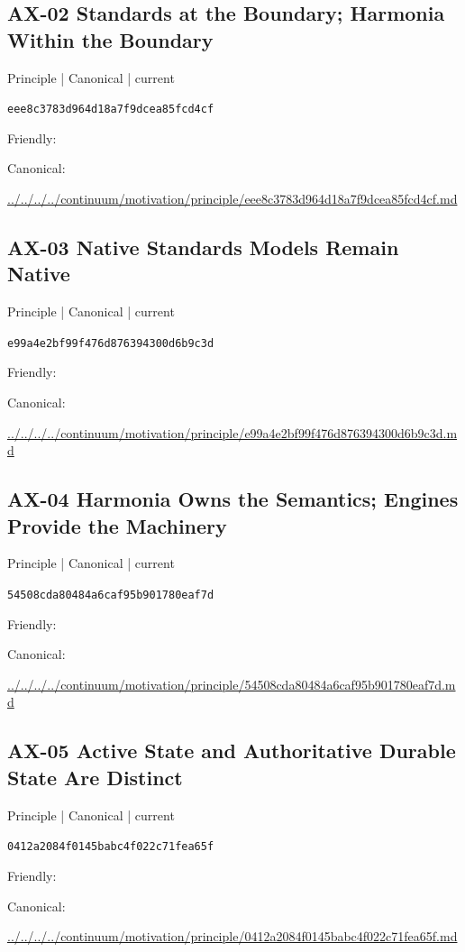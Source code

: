 \documentclass[10pt,a4paper]{article}
\begin{document}
\subsection*{AX-02 Standards at the Boundary; Harmonia Within the Boundary}
{\small Principle | Canonical | current}\par
\texttt{eee8c3783d964d18a7f9dcea85fcd4cf}\par
Friendly: \par
Canonical: \par
{\footnotesize\url{../../../../continuum/motivation/principle/eee8c3783d964d18a7f9dcea85fcd4cf.md}}\par
\subsection*{AX-03 Native Standards Models Remain Native}
{\small Principle | Canonical | current}\par
\texttt{e99a4e2bf99f476d876394300d6b9c3d}\par
Friendly: \par
Canonical: \par
{\footnotesize\url{../../../../continuum/motivation/principle/e99a4e2bf99f476d876394300d6b9c3d.md}}\par
\subsection*{AX-04 Harmonia Owns the Semantics; Engines Provide the Machinery}
{\small Principle | Canonical | current}\par
\texttt{54508cda80484a6caf95b901780eaf7d}\par
Friendly: \par
Canonical: \par
{\footnotesize\url{../../../../continuum/motivation/principle/54508cda80484a6caf95b901780eaf7d.md}}\par
\subsection*{AX-05 Active State and Authoritative Durable State Are Distinct}
{\small Principle | Canonical | current}\par
\texttt{0412a2084f0145babc4f022c71fea65f}\par
Friendly: \par
Canonical: \par
{\footnotesize\url{../../../../continuum/motivation/principle/0412a2084f0145babc4f022c71fea65f.md}}\par
\end{document}
